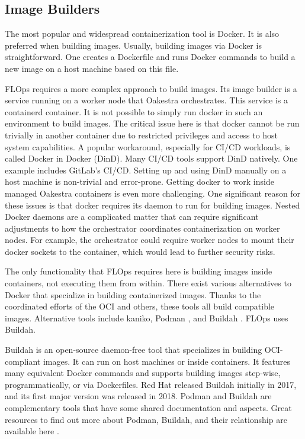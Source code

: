 \subsection{Image Builders} \label{subsection:image_builders}

The most popular and widespread containerization tool is Docker.
It is also preferred when building images.
Usually, building images via Docker is straightforward.
One creates a Dockerfile and runs Docker commands to build a new image on a host machine based on this file.

FLOps requires a more complex approach to build images.
Its image builder is a service running on a worker node that Oakestra orchestrates.
This service is a containerd container.
It is not possible to simply run docker in such an environment to build images.
The critical issue here is that docker cannot be run trivially in another container due to restricted privileges and access to host system capabilities.
A popular workaround, especially for CI/CD workloads, is called Docker in Docker (DinD).
Many CI/CD tools support DinD natively.
One example includes GitLab's CI/CD.
Setting up and using DinD manually on a host machine is non-trivial and error-prone.
Getting docker to work inside managed Oakestra containers is even more challenging.
One significant reason for these issues is that docker requires its daemon to run for building images.
Nested Docker daemons are a complicated matter that can require significant adjustments to how the orchestrator coordinates containerization on worker nodes.
For example, the orchestrator could require worker nodes to mount their docker sockets to the container, which would lead to further security risks.

The only functionality that FLOps requires here is building images inside containers, not executing them from within.
There exist various alternatives to Docker that specialize in building containerized images.
Thanks to the coordinated efforts of the OCI \cite{open_container_initiative} and others, these tools all build compatible images.
Alternative tools include kaniko, Podman \cite{docs:podman}, and Buildah \cite{buildah_homepage}.
FLOps uses Buildah.

Buildah is an open-source daemon-free tool that specializes in building OCI-compliant images.
It can run on host machines or inside containers.
It features many equivalent Docker commands and supports building images step-wise, programmatically, or via Dockerfiles.
Red Hat released Buildah initially in 2017, and its first major version was released in 2018.
Podman and Buildah are complementary tools that have some shared documentation and aspects.
Great resources to find out more about Podman, Buildah, and their relationship are available here \cite{redhat_docs:podman,redhat_docs:buildah,buildah_vs_podman}.

